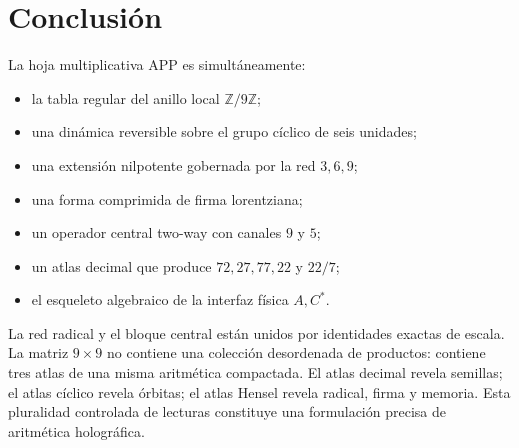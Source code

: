 \documentclass[11pt,a4paper]{article}
\newcommand{\Z}{\mathbb Z}
\begin{document}
\section{Conclusión}

La hoja multiplicativa APP es simultáneamente:
\begin{itemize}
\item la tabla regular del anillo local $\Z/9\Z$;
\item una dinámica reversible sobre el grupo cíclico de seis unidades;
\item una extensión nilpotente gobernada por la red $3,6,9$;
\item una forma comprimida de firma lorentziana;
\item un operador central two-way con canales $9$ y $5$;
\item un atlas decimal que produce $72,27,77,22$ y $22/7$;
\item el esqueleto algebraico de la interfaz física $A,C^\ast$.
\end{itemize}

La red radical y el bloque central están unidos por identidades exactas de escala. La matriz $9\times9$ no contiene una colección desordenada de productos: contiene tres atlas de una misma aritmética compactada. El atlas decimal revela semillas; el atlas cíclico revela órbitas; el atlas Hensel revela radical, firma y memoria. Esta pluralidad controlada de lecturas constituye una formulación precisa de aritmética holográfica.
\end{document}
